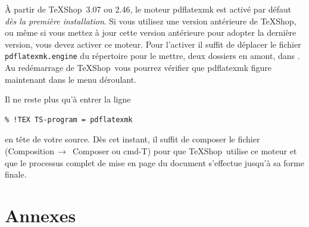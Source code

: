 \documentclass[11pt,french]{article}
\newcommand{\TS}{\textsf{\TeX Shop}}
\newcommand{\cmd}[1]{\textsf{#1}}
\newcommand{\mnu}[1]{\textsf{#1}}
\newcommand{\To}{\,\(\to\)\,}
\begin{document}
À partir de \TS\ 3.07 ou 2.46, le moteur pdflatexmk est activé par défaut \emph{dès la première installation}. Si vous utilisez une version antérieure de \TS, ou même si vous mettez à jour cette version antérieure pour adopter la dernière version, vous devez activer ce moteur. Pour l'activer il suffit de déplacer le fichier \texttt{pdflatexmk.engine} du répertoire  pour le mettre, deux dossiers en amont, dans . Au redémarrage de \TS\ vous pourrez vérifier que \cmd{pdflatexmk} figure maintenant dans le menu déroulant.

Il ne reste plus qu'à entrer la ligne
\begin{verbatim}
% !TEX TS-program = pdflatexmk
\end{verbatim}
en tête de votre source. Dès cet instant, il suffit de composer le fichier (\mnu{Composition}\To{} \mnu{Composer} ou \cmd{cmd-T}) pour que \TS\ utilise ce moteur et que le processus complet de mise en page du document s'effectue jusqu'à sa forme finale. 

\section*{Annexes}
\appendix

\end{document}

